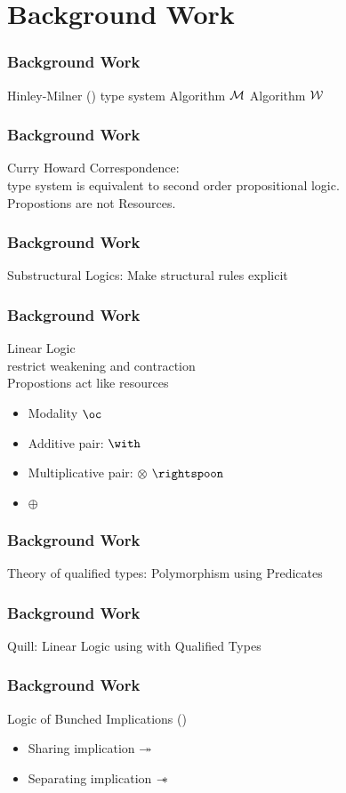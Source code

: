 \section{Background Work}\label{sec:background}
\begin{frame}[c]
  \frametitle{Background Work}
  Hinley-Milner (\HM{}) type system
  Algorithm $\mathcal{M}$\citep{damas_principal_1982}
  Algorithm $\mathcal{W}$\citep{lee_proofs_1998}
\end{frame}

\begin{frame}[c]
  \frametitle{Background Work}
  Curry Howard Correspondence: \\
  \HM type system is equivalent to second order propositional logic.\\
  Propostions are not Resources.
\end{frame}


\begin{frame}[c]
  \frametitle{Background Work}
  Substructural Logics:
  Make structural rules explicit
\end{frame}

\begin{frame}[c]
  \frametitle{Background Work}
  Linear Logic\citep{girard_linear_1987, wadler_taste_1993}\\
  restrict weakening and contraction\\
  Propostions act like resources\\
  \begin{itemize}
  \item Modality $\oc$
  \item Additive pair: $\with$
  \item Multiplicative pair: $\otimes$ $\rightspoon$
  \item $\oplus$
  \end{itemize}
\end{frame}

\begin{frame}[c]
  \frametitle{Background Work}
    Theory of qualified types: Polymorphism using Predicates \HM{}\citep{jones_theory_1994}
\end{frame}


\begin{frame}[c]
  \frametitle{Background Work}
  Quill: Linear Logic using with Qualified Types\citep{morris_best_2016}
\end{frame}

\begin{frame}[c]
  \frametitle{Background Work}
  Logic of Bunched Implications (\BI{})\citep{ohearn_logic_1999}
  \begin{itemize}
  \item Sharing implication $\twoheadrightarrow$
  \item Separating implication $\mathrel{-\mkern-6mu*}$
  \end{itemize}
\end{frame}


